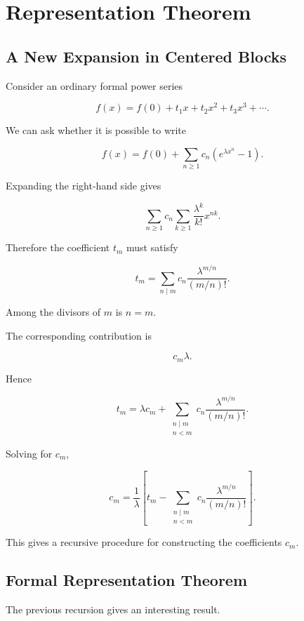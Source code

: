 
\chapter{Representation Theorem}

\section{A New Expansion in Centered Blocks}

Consider an ordinary formal power series

\[
f(x)
=
f(0)
+
t_1x
+
t_2x^2
+
t_3x^3
+\cdots.
\]

We can ask whether it is possible to write

\[
\boxed{
f(x)
=
f(0)
+
\sum_{n\geq1}
c_n
\left(
e^{\lambda x^n}-1
\right).
}
\]

Expanding the right-hand side gives

\[
\sum_{n\geq1}
c_n
\sum_{k\geq1}
\frac{\lambda^k}{k!}x^{nk}.
\]

Therefore the coefficient \(t_m\) must satisfy

\[
\boxed{
t_m
=
\sum_{n\mid m}
c_n
\frac{\lambda^{m/n}}{(m/n)!}.
}
\]

Among the divisors of \(m\) is \(n=m\).

The corresponding contribution is

\[
c_m\lambda.
\]

Hence

\[
t_m
=
\lambda c_m
+
\sum_{\substack{n\mid m\\n<m}}
c_n
\frac{\lambda^{m/n}}{(m/n)!}.
\]

Solving for \(c_m\),

\[
\boxed{
c_m
=
\frac{1}{\lambda}
\left[
t_m
-
\sum_{\substack{n\mid m\\n<m}}
c_n
\frac{\lambda^{m/n}}{(m/n)!}
\right].
}
\]

This gives a recursive procedure for constructing the coefficients
\(c_m\).

\section{Formal Representation Theorem}

The previous recursion gives an interesting result.

